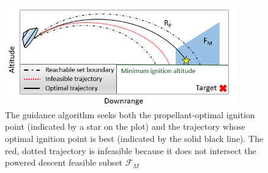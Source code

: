 \documentclass[letterpaper, preprint, paper,11pt]{AAS}
\begin{document}
%
%
\begin{figure}[h!]
	\centering
	\includegraphics[width=0.9\textwidth]{Optimization} 
	\caption{The guidance algorithm seeks both the propellant-optimal ignition point (indicated by a star on the plot) and the trajectory whose optimal ignition point is best (indicated by the solid black line). The red, dotted trajectory is infeasible because it does not intersect the powered descent feasible subset $\mathcal{F}_M$}
	\label{fig_optimization}
\end{figure}


\end{document}
